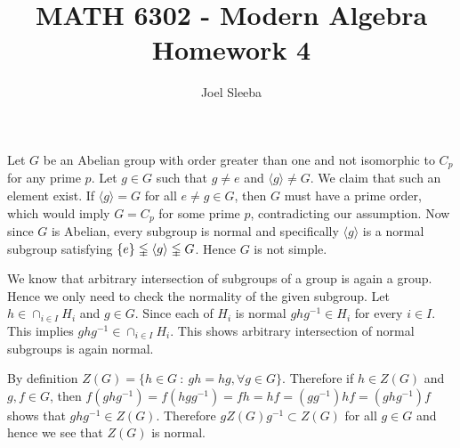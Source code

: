 \documentclass[12pt]{exam}
\theoremstyle{plain} %
\theoremstyle{definition} %
\theoremstyle{remark} %
\begin{document}
\title{MATH 6302 - Modern Algebra \\ Homework 4}

\author{
Joel Sleeba \\
}

\maketitle
\printanswers
\unframedsolutions

\begin{questions}
  
  \question
  \begin{solution}
    Let $G$ be an Abelian group with order greater than one and not isomorphic to $C_p$ for any prime $p$. Let $g \in G$ such that $g \neq e$ and $\langle g \rangle \neq G$. We claim that such an element exist. If $\langle g \rangle = G$ for all $e \neq g \in G$, then $G$ must have a prime order, which would imply $G = C_p$ for some prime $p$, contradicting our assumption. Now since $G$ is Abelian, every subgroup is normal and specifically $\langle g \rangle $ is a normal subgroup satisfying $\{ e \} \lvertneqq \langle g  \rangle \lvertneqq G$. Hence $G$ is not simple.
  \end{solution}

  \question
  \begin{solution}
    We know that arbitrary intersection of subgroups of a group is again a group. Hence we only need to check the normality of the given subgroup.
    Let $h \in \cap_{i \in I}H_i$ and $g \in G$. Since each of $H_i$ is normal $ghg^{-1} \in H_i$ for every $i \in I$. This implies $ghg^{-1} \in \cap_{i \in I}H_i$. This shows arbitrary intersection of normal subgroups is again normal.
  \end{solution}
  
  \question
  \begin{solution}
    By definition $Z(G) = \{ h \in G \ : \ gh = hg, \forall g \in G \}$. Therefore if $h \in Z(G)$ and $g, f \in G$, then $f(ghg^{-1}) = f(hgg^{-1}) = fh = hf = (gg^{-1})hf = (ghg^{-1}) f$ shows that $ghg^{-1} \in Z(G)$. Therefore $gZ(G)g^{-1} \subset Z(G)$ for all $g \in G$ and hence we see that $Z(G)$ is normal.
  \end{solution}


\end{questions}
\end{document}

